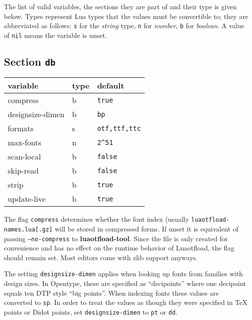 \documentclass[a4paper]{article}
\newlength{\DUtablewidth} %
\begin{document}
The list of valid variables, the sections they are part of and their
type is given below. Types represent Lua types that the values must be
convertible to; they are abbreviated as follows: \texttt{s} for the \emph{string}
type, \texttt{n} for \emph{number}, \texttt{b} for \emph{boolean}. A value of \texttt{nil} means
the variable is unset.


\subsection{Section \texttt{db}%
  \label{section-db}%
}

\setlength{\DUtablewidth}{\linewidth}
\begin{longtable*}[c]{|p{0.249\DUtablewidth}|p{0.110\DUtablewidth}|p{0.331\DUtablewidth}|}
\hline

variable
 & 
type
 & 
default
 \\
\hline

compress
 & 
b
 & 
\texttt{true}
 \\
\hline

designsize-dimen
 & 
b
 & 
\texttt{bp}
 \\
\hline

formats
 & 
s
 & 
\texttt{\textquotedbl{}otf,ttf,ttc\textquotedbl{}}
 \\
\hline

max-fonts
 & 
n
 & 
\texttt{2\textasciicircum{}51}
 \\
\hline

scan-local
 & 
b
 & 
\texttt{false}
 \\
\hline

skip-read
 & 
b
 & 
\texttt{false}
 \\
\hline

strip
 & 
b
 & 
\texttt{true}
 \\
\hline

update-live
 & 
b
 & 
\texttt{true}
 \\
\hline
\end{longtable*}

The flag \texttt{compress} determines whether the font index (usually
\texttt{luaotfload-names.lua{[}.gz{]}} will be stored in compressed forms.
If unset it is equivalent of passing \texttt{--no-compress} to
\textbf{luaotfload-tool}. Since the file is only created for convenience
and has no effect on the runtime behavior of Luaotfload, the flag
should remain set. Most editors come with zlib support anyways.

The setting \texttt{designsize-dimen} applies when looking up fonts from
families with design sizes. In Opentype, these are specified as
“decipoints” where one decipoint equals ten DTP style “big points”.
When indexing fonts these values are converted to \texttt{sp}. In order to
treat the values as though they were specified in TeX points or Didot
points, set \texttt{designsize-dimen} to \texttt{pt} or \texttt{dd}.
\end{document}
